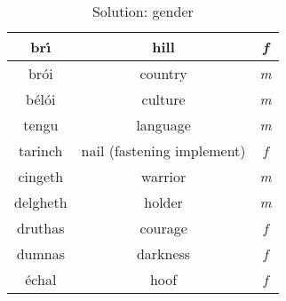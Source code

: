 \begin{table}[H]
{{\begin{tabular}{|c|c|>{\itshape}c|}
      \midrule
      br\'{\i} & hill & f\\
      \midrule
      br\'{o}i & country & m\\
      \midrule
      b\'{e}l\'{o}i & culture & m\\
      \midrule
      tengu & language & m\\
      \midrule
      tarinch & nail (fastening implement) & f\\
      \midrule
      cingeth & warrior & m\\
      \midrule
      delgheth & holder & m\\
      \midrule
      druthas & courage & f\\
      \midrule
      dumnas & darkness & f\\
      \'{e}chal & hoof & f\\
      \bottomrule
    \end{tabular}
  }
}
\label{solution_gender}
\caption{Solution: gender}
\end{table}
